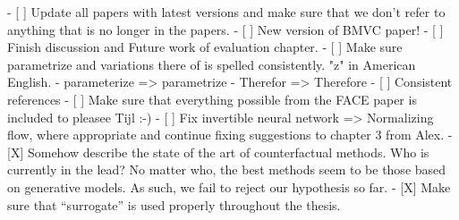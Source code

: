   - [ ] Update all papers with latest versions and make sure that we don't refer to anything that is no longer in the papers. 
  - [ ] New version of BMVC paper!
  - [ ] Finish discussion and Future work of evaluation chapter.
  - [ ] Make sure parametrize and variations there of is spelled consistently. "z" in American English.
        - parameterize => parametrize
        - Therefor => Therefore
  - [ ] Consistent references
  - [ ] Make sure that everything possible from the FACE paper is included to pleasee Tijl :-)
  - [ ] Fix invertible neural network => Normalizing flow, where appropriate and continue fixing suggestions to chapter 3 from Alex.
  - [X] Somehow describe the state of the art of counterfactual methods. Who is currently in the lead? No matter who, the best methods seem to be those based on generative models. As such, we fail to reject our hypothesis so far. 
  - [X] Make sure that ``surrogate'' is used properly throughout the thesis. 